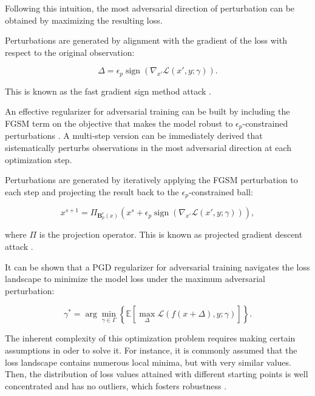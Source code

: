 Following this intuition, the most adversarial direction of 
perturbation can be obtained by maximizing the resulting loss.

\begin{attack}
    Perturbations are generated by alignment with the gradient of the 
    loss with respect to the original observation:
    
    $$
    \Delta = \epsilon_p \operatorname{sign}(\nabla_{x'} \mathcal{L}(x', y; \gamma)).
    $$

    This is known as the fast gradient sign method attack
    \cite{goodfellowExplainingHarnessingAdversarial2015}.
\end{attack}

An effective regularizer for adversarial training can be built by 
including the FGSM term on the objective that makes the model robust 
to $\epsilon_p$-constrained perturbations \cite{goodfellowExplainingHarnessingAdversarial2015}. 
A multi-step version can be immediately derived that sistematically
perturbs observations in the most adversarial direction at each
optimization step.

\begin{attack}
    Perturbations are generated by iteratively applying the FGSM
    perturbation to each step and projecting the result back to the
    $\epsilon_p$-constrained ball:

    $$
        x^{s+1} = \Pi_{\mathbf{B}_p^\epsilon(x)} \left ( x^s + \epsilon_p \operatorname{sign}(\nabla_{x'} \mathcal{L}(x', y; \gamma)) \right ),
    $$

    where $\Pi$ is the projection operator. This is known as
    projected gradient descent attack
    \cite{madryDeepLearningModels2019}.
    \label{attack:pgd}
\end{attack}

It can be shown that a PGD regularizer for adversarial training navigates
the loss landscape to minimize the model loss under
the maximum adversarial perturbation:

$$
    \gamma^* = \arg \min_{\gamma \in \Gamma} \left \{ \mathbb{E} \left[ \max_{\Delta} \mathcal{L} (f(x + \Delta), y; \gamma) \right]  \right \}.
$$

The inherent complexity of this optimization problem requires making
certain assumptions in oder to solve it. For instance, it is commonly
assumed that the loss landscape contains numerous local minima, but
with very similar values. Then, the distribution of loss values attained
with different starting points is well concentrated and has no outliers,
which fosters robustness
\cite{madryDeepLearningModels2019}.\\

